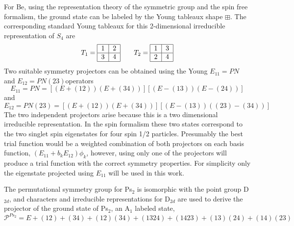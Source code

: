 \documentclass[12pt,thmsa]{article}
\begin{document}
For Be, using the representation theory of the symmetric group and the spin
free formalism\cite{Matson70}, the ground state can be labeled by the Young
tableaux shape $\boxplus $. The corresponding standard Young tableaux for
this 2-dimensional irreducible representation of $S_4$ are 
\[
T_1= 
\begin{tabular}{|l|l|}
\hline
1 & 2 \\ \hline
3 & 4 \\ \hline
\end{tabular}
\,\,\,\,\,\,\,\,\,\,\,\,T_2= 
\begin{tabular}{|l|l|}
\hline
1 & 3 \\ \hline
2 & 4 \\ \hline
\end{tabular}
\]
Two suitable symmetry projectors can be obtained using the Young $E_{11}=PN$
and $E_{12}=PN(23)$operators 
\begin{equation}
E_{11}=PN=\left[ \left( E+\left( 12\right) \right) \left( E+\left( 34\right)
\right) \right] \left[ \left( E-\left( 13\right) \right) \left( E-\left(
24\right) \right) \right]  \label{NP}
\end{equation}
and 
\begin{equation}
E_{12}=PN\left( 23\right) =\left[ \left( E+\left( 12\right) \right) \left(
E+\left( 34\right) \right) \right] \left[ \left( E-\left( 13\right) \right)
\left( \left( 23\right) -\left( 34\right) \right) \right]
\end{equation}
The two independent projectors arise because this is a two dimensional
irreducible representation. In the spin formalism these two states
correspond to the two singlet spin eigenstates for four spin 1/2 particles.
Presumably the best trial function would be a weighted combination of both
projectors on each basis function, $\left( E_{11}+b_kE_{12}\right) \phi _k$,
however, using only one of the projectors will produce a trial function with
the correct symmetry properties. For simplicity only the eigenstate
projected using $E_{11}$ will be used in this work.

The permutational symmetry group for Ps$_2$ is isomorphic with the point
group D$_{2d}$, and characters and irreducible representations for D$_{2d}$
are used to derive the projector of the ground state of Ps$_2$, an A$_1$
labeled state, 
\begin{equation}
\mathcal{P}^{Ps_2}=E+\left( 12\right) +\left( 34\right) +\left( 12\right)
\left( 34\right) +\left( 1324\right) +\left( 1423\right) +\left( 13\right)
\left( 24\right) +\left( 14\right) \left( 23\right)  \label{Ps2proj}
\end{equation}
\end{document}
